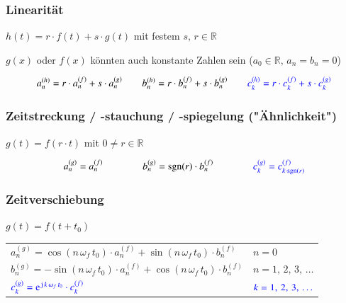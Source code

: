 \subsubsection{Linearität}
\begin{center}
\end{center}

$h(t) = r \cdot f(t) + s \cdot g(t)$ mit festem $s, \, r \in \mathbb{R}$

$g(x)$ oder $f(x)$ könnten auch konstante Zahlen sein ($a_0 \in \mathbb{R}, \, a_n = b_n = 0$)

$$ a_n^{(h)} = r \cdot a_n^{(f)} + s \cdot a_n^{(g)} \qquad b_n^{(h)} = r \cdot b_n^{(f)} + s \cdot b_n^{(g)} \qquad {\color{blue}c_k^{(h)} = r \cdot c_k^{(f)} + s \cdot c_k^{(g)}}$$

\subsubsection{Zeitstreckung / -stauchung / -spiegelung ("Ähnlichkeit")}

$g(t) = f(r \cdot t)$ mit $0 \neq r \in \mathbb{R}$ \qquad {}

\[ a_n^{(g)} = a_n^{(f)} \qquad \qquad b_n^{(g)} = \mathop{} \! \mathrm{sgn}(r) \cdot b_n^{(f)}
    \qquad \qquad {\color{blue}c_k^{(g)} = c_{k\cdot \ensuremath{\mathop{} \! \mathrm{sgn}}(r)}^{(f)}}\]

\subsubsection{Zeitverschiebung}
$g(t) = f(t + t_0)$

\smallskip

\renewcommand{\arraystretch}{1.7}
\begin{tabular}{ll}
    $ a_n^{(g)} = \cos(n \, \omega_f \, t_0) \cdot a_n^{(f)} + \sin(n \, \omega_f \, t_0) \cdot b_n^{(f)}$   & $n = 0$ \quad [mit $b_0 = 0, \, 1, \, 2, \, \ldots$] \\
    $ b_n^{(g)} = -\sin(n \, \omega_f \, t_0) \cdot a_n^{(f)} + \cos(n \, \omega_f \, t_0) \cdot  b_n^{(f)}$ & $n = 1, \, 2, \, 3, \, \ldots$                       \\
    $ \cbl{c_k^{(g)} = \e^{\jimg \, k \, \omega_f \, t_0} \cdot c_k^{(f)}}$                                  & ${\color{blue}k  =1, \, 2, \, 3, \, \ldots}$
\end{tabular}
\renewcommand{\arraystretch}{1}


